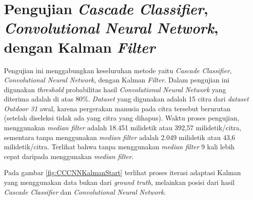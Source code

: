 \section{Pengujian \textit{Cascade Classifier}, \textit{Convolutional Neural Network}, dengan Kalman \textit{Filter}}
\noindent Pengujian ini menggabungkan keseluruhan metode yaitu \textit{Cascade Classifier}, \textit{Convolutional Neural Network}, dengan Kalman \textit{Filter}. Dalam pengujian ini digunakan \textit{threshold} probabilitas hasil \textit{Convolutional Neural Network} yang diterima adalah di atas 80\%. \textit{Dataset} yang digunakan adalah 15 citra dari \textit{dataset Outdoor 31} awal, karena pergerakan manusia pada citra tersebut berurutan (setelah diseleksi tidak ada yang citra yang dihapus). Waktu proses pengujian, menggunakan \textit{median filter} adalah 18.451 milidetik atau 392,57 milidetik/citra, sementara tanpa menggunakan \textit{median filter} adalah 2.049 milidetik atau 43,6 milidetik/citra. Terlihat bahwa tanpa menggunakan \textit{median filter} 9 kali lebih cepat daripada menggunakan \textit{median filter}.

\noindent Pada gambar \ref{fig:CCCNNKalmanStart} terlihat proses iterasi adaptasi Kalman yang menggunakan data bukan dari \textit{ground truth}, melainkan posisi dari hasil \textit{Cascade Classifier} dan \textit{Convolutional Neural Network}.

\begin{adjustbox}{width=1\textwidth}
\noindent\begin{minipage}{\linewidth}
	\label{fig:CCCNNKalmanStart}
\end{minipage}
\end{adjustbox}

